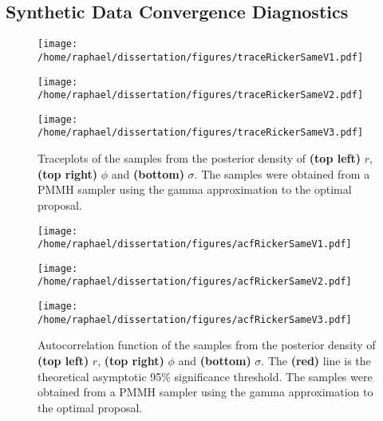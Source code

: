\documentclass[12pt]{article}
\begin{document}
\begin{appendices}
	\subsection{Synthetic Data Convergence Diagnostics}
\clearpage
\thispagestyle{empty}
	\begin{figure}[htb]
		\centering
		\begin{minipage}{0.6\textwidth}
			\centering
			\texttt{[image: /home/raphael/dissertation/figures/traceRickerSameV1.pdf]}
		\end{minipage}
		\begin{minipage}{0.6\textwidth}
			\centering
			\texttt{[image: /home/raphael/dissertation/figures/traceRickerSameV2.pdf]}
		\end{minipage}
		\begin{minipage}{0.6\textwidth}
			\centering
			\texttt{[image: /home/raphael/dissertation/figures/traceRickerSameV3.pdf]}
		\end{minipage}
		\caption[Traceplots of a run of a PMMH sampler on data simulated from the Ricker model]{Traceplots of the samples from the posterior density of \textbf{(top left)} $r$, \textbf{(top right)} $\phi$ and \textbf{(bottom)} $\sigma$. The samples were obtained from a PMMH sampler using the gamma approximation to the optimal proposal.}
		\label{fig:traceplotDiag}
	\end{figure}
\clearpage
\thispagestyle{empty}
	\begin{figure}[htb]
		\centering
		\begin{minipage}{0.6\textwidth}
			\centering
			\texttt{[image: /home/raphael/dissertation/figures/acfRickerSameV1.pdf]}
		\end{minipage}
		\begin{minipage}{0.6\textwidth}
			\centering
			\texttt{[image: /home/raphael/dissertation/figures/acfRickerSameV2.pdf]}
		\end{minipage}
		\begin{minipage}{0.6\textwidth}
			\centering
			\texttt{[image: /home/raphael/dissertation/figures/acfRickerSameV3.pdf]}
		\end{minipage}
		\caption[Autocorrelations functions of a run of a PMMH sampler on data simulated from the Ricker model]{Autocorrelation function of the samples from the posterior density of \textbf{(top left)} $r$, \textbf{(top right)} $\phi$ and \textbf{(bottom)} $\sigma$. The \textbf{(red)} line is the theoretical asymptotic 95\% significance threshold. The samples were obtained from a PMMH sampler using the gamma approximation to the optimal proposal.}
		\label{fig:acfDiag}
	\end{figure}


\end{appendices}
\end{document}
